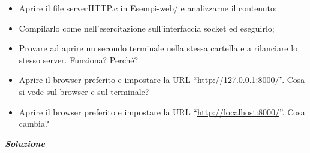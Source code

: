 \documentclass[a4paper]{article}
\newcommand{\dquotes}[1]{``#1''}
\begin{document}
	\begin{itemize}
		\item Aprire il file \textsf{serverHTTP.c} in \textsf{Esempi-web/} e analizzarne il contenuto;
		
		\item Compilarlo come nell'esercitazione sull'interfaccia socket ed eseguirlo;
		
		\item Provare ad aprire un secondo terminale nella stessa cartella e a rilanciare lo stesso server. Funziona? Perché?
		
		\item Aprire il browser preferito e impostare la URL \dquotes{\url{http://127.0.0.1:8000/}}. Cosa si vede sul browser e sul terminale?
		
		\item Aprire il browser preferito e impostare la URL \dquotes{\url{http://localhost:8000/}}. Cosa cambia?
	\end{itemize}
	
	\noindent
	\textcolor{Green4}{\underline{\textbf{\emph{Soluzione}}}}\newline
	
\end{document}
